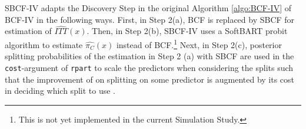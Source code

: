 SBCF-IV adapts the Discovery Step in the original Algorithm \ref{algo:BCF-IV} of BCF-IV in the following ways. First, in Step 2(a), BCF \citep{hahn_bayesian_2020} is replaced by SBCF for estimation of $\widehat{ITT}(x)$. 
Then, in Step 2(b), SBCF-IV uses a SoftBART probit algorithm to estimate $\widehat{\pi_C}(x)$ instead of BCF.\footnote{This is not yet implemented in the current Simulation Study.} 
Next, in Step 2(c), posterior splitting probabilities of the estimation in Step 2 (a) with SBCF are used in the \texttt{cost}-argument of \texttt{rpart} to scale the predictors when considering the splits such that the improvement of on splitting on some predictor is augmented by its cost in deciding which split to use \cite{therneau}.








